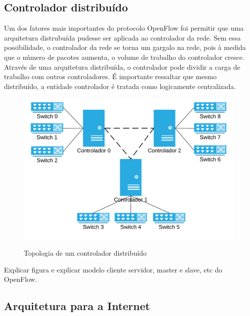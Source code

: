 \subsection{Controlador distribuído}

Um dos fatores mais importantes do protocolo OpenFlow foi permitir que 
uma arquitetura distrubuída pudesse ser aplicada ao controlador da rede.
Sem essa possibilidade, o controlador da rede se torna um gargalo na rede, 
pois à medida que o número de pacotes aumenta, o volume de trabalho do 
controlador cresce. 
Através de uma arquitetura distribuída, o controlador pode dividir a carga 
de trabalho com outros controladores.
É importante ressaltar que mesmo distribuído, a entidade controlador
é tratada como logicamente centralizada.

\begin{figure}[h!]
    \centering
    \includegraphics{img/distributed-controller}
    \label{fig:distributed-controller}
    \caption{Topologia de um controlador distribuído}
\end{figure}

Explicar figura e explicar modelo cliente servidor, master e slave, etc do 
OpenFlow.


\subsection{Arquitetura para a Internet}
